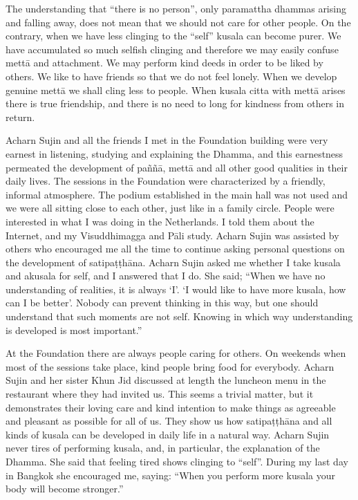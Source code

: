 The understanding that ``there is no person'', only paramattha dhammas arising and falling away, does not mean that we should not care for other people. On the contrary, when we have less clinging to the ``self'' kusala can become purer. We have accumulated so much selfish clinging and therefore we may easily confuse mettā and attachment. We may perform kind deeds in order to be liked by others. We like to have friends so that we do not feel lonely. When we develop genuine mettā we shall cling less to people. When kusala citta with mettā arises there is true friendship, and there is no need to long for kindness from others in return.

Acharn Sujin and all the friends I met in the Foundation building were very earnest in listening, studying and explaining the Dhamma, and this earnestness permeated the development of paññā, mettā and all other good qualities in their daily lives. The sessions in the Foundation were characterized by a friendly, informal atmosphere. The podium established in the main hall was not used and we were all sitting close to each other, just like in a family circle. People were interested in what I was doing in the Netherlands. I told them about the Internet, and my Visuddhimagga and Pāli study. Acharn Sujin was assisted by others who encouraged me all the time to continue asking personal questions on the development of satipaṭṭhāna. Acharn Sujin asked me whether I take kusala and akusala for self, and I answered that I do. She said; ``When we have no understanding of realities, it is always ‘I’. ‘I would like to have more kusala, how can I be better’. Nobody can prevent thinking in this way, but one should understand that such moments are not self. Knowing in which way understanding is developed is most important.''

At the Foundation there are always people caring for others. On weekends when most of the sessions take place, kind people bring food for everybody. Acharn Sujin and her sister Khun Jid discussed at length the luncheon menu in the restaurant where they had invited us. This seems a trivial matter, but it demonstrates their loving care and kind intention to make things as agreeable and pleasant as possible for all of us. They show us how satipaṭṭhāna and all kinds of kusala can be developed in daily life in a natural way. Acharn Sujin never tires of performing kusala, and, in particular, the explanation of the Dhamma. She said that feeling tired shows clinging to ``self''. During my last day in Bangkok she encouraged me, saying: ``When you perform more kusala your body will become stronger.''


